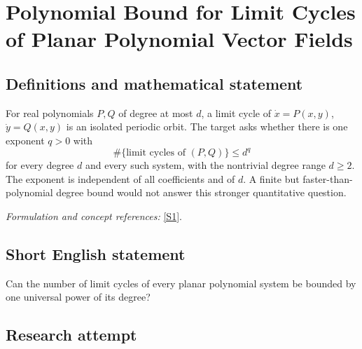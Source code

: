 \documentclass[11pt,a4paper]{article}
\newcommand{\sref}[2]{\hyperlink{source:#1:#2}{[S#2]}}
\newif\ifshowcatalogue
\newcommand{\cataloguescope}[1]{\ifshowcatalogue
 \paragraph{Exact scope in the supplied catalogue.}
 \begin{quote}\small #1\end{quote}\fi}
\numberwithin{equation}{section}
\begin{document}
\setcounter{section}{124}
\setlength{\parskip}{3pt plus 1pt}
\clearpage
\section{\texorpdfstring{Polynomial Bound for Limit Cycles of Planar Polynomial Vector Fields}{Polynomial Bound for Limit Cycles of Planar Polynomial Vector Fields}}\label{125}
\subsection{Definitions and mathematical statement}
For real polynomials $P,Q$ of degree at most $d$, a limit cycle of $\dot x=P(x,y)$, $\dot y=Q(x,y)$ is an isolated periodic orbit. The target asks whether there is one exponent $q>0$ with
\[
 \#\{\text{limit cycles of }(P,Q)\}\le d^q
\]
for every degree $d$ and every such system, with the nontrivial degree range $d\ge2$. The exponent is independent of all coefficients and of $d$. A finite but faster-than-polynomial degree bound would not answer this stronger quantitative question.
\par\smallskip\textit{Formulation and concept references:} \sref{125}{1}.
\cataloguescope{Determine whether the number K of limit cycles of every planar polynomial differential system of degree at most d satisfies K \ensuremath{\le} d\textasciicircum{}q for some universal exponent q.}
\subsection{Short English statement}
Can the number of limit cycles of every planar polynomial system be bounded by one universal power of its degree?
\subsection{Research attempt}
\end{document}
